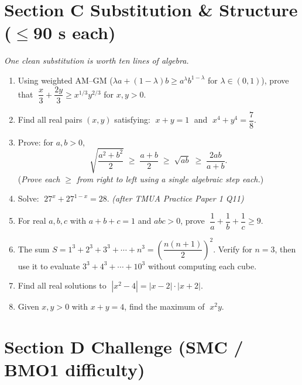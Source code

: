 \documentclass[11pt,a4paper]{article}
\begin{document}
\section*{Section C \quad Substitution \& Structure \hfill{\normalfont\small($\leq$90 s each)}}

\noindent\textit{One clean substitution is worth ten lines of algebra.}

\begin{enumerate}

\item Using weighted AM--GM ($\lambda a + (1-\lambda)b \geq a^\lambda b^{1-\lambda}$
      for $\lambda \in (0,1)$), prove that $\;\dfrac{x}{3} + \dfrac{2y}{3} \geq x^{1/3}y^{2/3}$
      for $x, y > 0$.

\item Find all real pairs $(x, y)$ satisfying:
      $\;x + y = 1\;$ and $\;x^4 + y^4 = \dfrac{7}{8}$.

\item Prove: for $a, b > 0$,
\[
  \sqrt{\frac{a^2+b^2}{2}} \;\geq\; \frac{a+b}{2} \;\geq\; \sqrt{ab} \;\geq\; \frac{2ab}{a+b}.
\]
(\textit{Prove each $\geq$ from right to left using a single algebraic step each.})

\item Solve: $\;27^x + 27^{1-x} = 28$. \textit{\small(after TMUA Practice Paper 1 Q11)}

\item For real $a, b, c$ with $a + b + c = 1$ and $abc > 0$,
      prove $\;\dfrac{1}{a} + \dfrac{1}{b} + \dfrac{1}{c} \geq 9$.

\item The sum $S = 1^3 + 2^3 + 3^3 + \cdots + n^3 = \left(\dfrac{n(n+1)}{2}\right)^2$.
      Verify for $n = 3$, then use it to evaluate $3^3+4^3+\cdots+10^3$ without
      computing each cube.

\item Find all real solutions to $\;|x^2 - 4| = |x - 2| \cdot |x + 2|$.

\item Given $x, y > 0$ with $x + y = 4$, find the maximum of $\;x^2 y$.

\end{enumerate}

\section*{Section D \quad Challenge \hfill{\normalfont\small(SMC / BMO1 difficulty)}}
\end{document}
